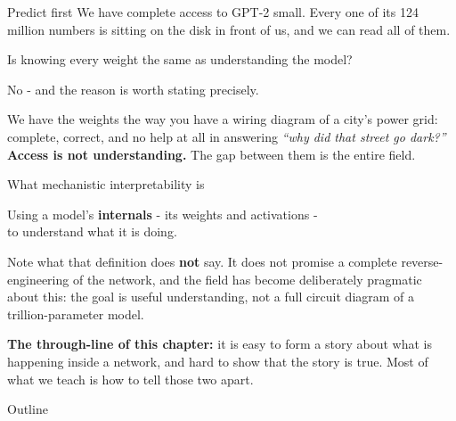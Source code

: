 \documentclass[aspectratio=169]{beamer}
\newcommand{\trapbox}[1]{%
  \begin{tcolorbox}[colback=armred!8, colframe=armred, boxrule=0.6pt, arc=2pt]
  #1
  \end{tcolorbox}}
\newcommand{\takebox}[1]{%
  \begin{tcolorbox}[colback=paramgreen!8, colframe=paramgreen, boxrule=0.6pt, arc=2pt]
  #1
  \end{tcolorbox}}
\begin{document}
\begin{frame}{Predict first}
  \vspace{0.6em}
  We have complete access to GPT-2 small. Every one of its 124 million numbers is sitting on the
  disk in front of us, and we can read all of them.

  \vspace{1.1em}
  \begin{center}
    {\large Is knowing every weight the same as understanding the model?}
  \end{center}

  \vspace{1.1em}
  \pause
  No - and the reason is worth stating precisely.

  \vspace{0.5em}
  \trapbox{We have the weights the way you have a wiring diagram of a city's power grid: complete,
  correct, and no help at all in answering \emph{``why did that street go dark?''}
  \textbf{Access is not understanding.} The gap between them is the entire field.}
\end{frame}

\begin{frame}{What mechanistic interpretability is}
  \vspace{1.0em}
  \begin{center}
  \begin{tcolorbox}[colback=armblue!8, colframe=armblue, boxrule=0.8pt, arc=3pt, width=0.9\textwidth]
    \centering\large
    Using a model's \textbf{internals} - its weights and activations -\\ to understand what it
    is doing.
  \end{tcolorbox}
  \end{center}

  \vspace{1.0em}
  Note what that definition does \textbf{not} say. It does not promise a complete
  reverse-engineering of the network, and the field has become deliberately pragmatic about
  this: the goal is useful understanding, not a full circuit diagram of a trillion-parameter
  model.

  \vspace{0.9em}
  \takebox{\textbf{The through-line of this chapter:} it is easy to form a story about what is
  happening inside a network, and hard to show that the story is true. Most of what we teach is
  how to tell those two apart.}
\end{frame}

\begin{frame}{Outline}
  \tableofcontents
\end{frame}
\end{document}
